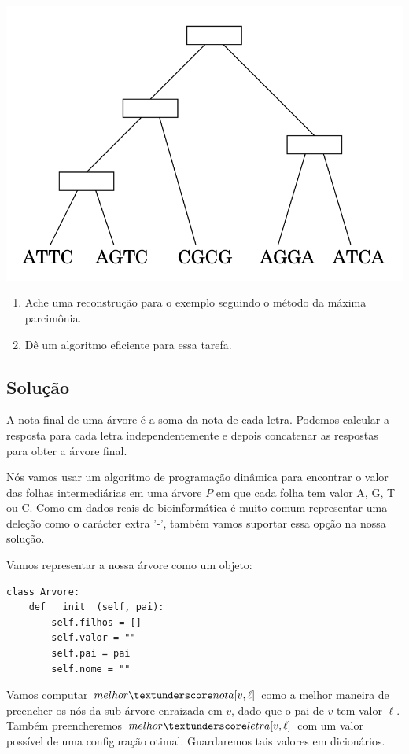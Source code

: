 \documentclass[11pt]{article}
\newcommand{\tu}{\textunderscore}
\begin{document}
\href{http://github.com/adusca/FGV-EDA/6_30/tree.png}{\includegraphics[width=.9\linewidth]{tree.png}}

\begin{enumerate}
\item Ache uma reconstrução para o exemplo seguindo o método da
máxima parcimônia.
\item Dê um algoritmo eficiente para essa tarefa.
\end{enumerate}

\subsection{Solução}
\label{sec-4-2}

A nota final de uma árvore é a soma da nota de cada letra. Podemos
calcular a resposta para cada letra independentemente e depois
concatenar as respostas para obter a árvore final.

Nós vamos usar um algoritmo de programação dinâmica para encontrar o
valor das folhas intermediárias em uma árvore $P$ em que cada folha
tem valor A, G, T ou C. Como em dados reais de bioinformática é muito
comum representar uma deleção como o carácter extra '-', também vamos
suportar essa opção na nossa solução.

Vamos representar a nossa árvore como um objeto:
\begin{verbatim}
class Arvore:
    def __init__(self, pai):
        self.filhos = []
        self.valor = ""
        self.pai = pai
        self.nome = ""
\end{verbatim}

Vamos computar $melhor\tu nota[v, \ell]$ como a melhor maneira de
preencher os nós da sub-árvore enraizada em $v$, dado que o pai de $v$
tem valor $\ell$. Também preencheremos $melhor \tu letra[v, \ell]$ com um valor possível
de uma configuração otimal. Guardaremos tais valores em dicionários.
\end{document}
